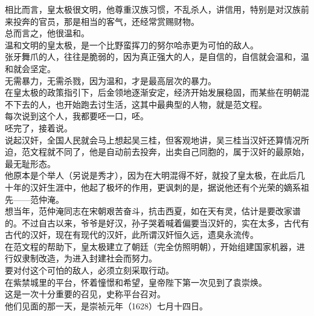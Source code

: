 \begin{multicols}{\theparacolNo}
相比而言，皇太极很文明，他尊重汉族习惯，不乱杀人，讲信用，特别是对汉族前来投奔的官员，那是相当的客气，还经常赏赐财物。\\

总而言之，他很温和。\\

温和文明的皇太极，是一个比野蛮挥刀的努尔哈赤更为可怕的敌人。\\

张牙舞爪的人，往往是脆弱的，因为真正强大的人，是自信的，自信就会温和，温和就会坚定。\\

无需暴力，无需杀戮，因为温和，才是最高层次的暴力。\\

在皇太极的政策指引下，后金领地逐渐安定，经济开始发展稳固，而某些在明朝混不下去的人，也开始跑去讨生活，这其中最典型的人物，就是范文程。\\

每次说到这个人，我都要呸一口，呸。\\

呸完了，接着说。\\

说起汉奸，全国人民就会马上想起吴三桂，但客观地讲，吴三桂当汉奸还算情况所迫，范文程就不同了，他是自动前去投奔，出卖自己同胞的，属于汉奸的最原始，最无耻形态。\\

他原本是个举人（另说是秀才），因为在大明混得不好，就投了皇太极，在此后几十年的汉奸生涯中，他起了极坏的作用，更讽刺的是，据说他还有个光荣的嫡系祖先——范仲淹。\\

想当年，范仲淹同志在宋朝艰苦奋斗，抗击西夏，如在天有灵，估计是要改家谱的。不过自古以来，爷爷是好汉，孙子哭着喊着偏要当汉奸的，实在太多，古代有古代的汉奸，现在有现代的汉奸，此所谓汉奸恒久远，遗臭永流传。\\

在范文程的帮助下，皇太极建立了朝廷（完全仿照明朝），开始组建国家机器，进行奴隶制改造，为进入封建社会而努力。\\

要对付这个可怕的敌人，必须立刻采取行动。\\

在紫禁城里的平台，怀着憧憬和希望，皇帝陛下第一次见到了袁崇焕。\\

这是一次十分重要的召见，史称平台召对。\\

他们见面的那一天，是崇祯元年（1628）七月十四日。\\


\end{multicols}
